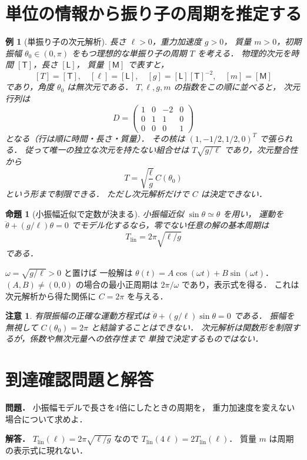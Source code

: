 \documentclass[a5paper,10pt,onecolumn]{jsarticle}
\makeatletter
\theoremstyle{mathnotetheorem}
\newtheorem{proposition}[theorem]{命題}
\newtheorem{example}[theorem]{例}
\newtheorem{remark}[theorem]{注意}
\renewcommand{\proofname}{証明}
\renewenvironment{proof}[1][\proofname]{%
  \par\pushQED{\qed}\normalfont\topsep4\p@\@plus2\p@\relax
  \trivlist\item[\hskip\labelsep\bfseries #1]\ignorespaces
}{\popQED\endtrivlist\@endpefalse}
\makeatother
\begin{document}
\section{単位の情報から振り子の周期を推定する}
\begin{example}[単振り子の次元解析]
長さ $\ell>0$，重力加速度 $g>0$，
質量 $m>0$，初期振幅 $\theta_0\in(0,\pi)$
をもつ理想的な単振り子の周期 $T$ を考える．
物理的次元を時間 $[\mathsf T]$，長さ $[\mathsf L]$，
質量 $[\mathsf M]$ で表すと，
\[
 [T]=[\mathsf T],\quad [\ell]=[\mathsf L],
 \quad [g]=[\mathsf L][\mathsf T]^{-2},
 \quad[m]=[\mathsf M]
\]
であり，角度 $\theta_0$ は無次元である．
$T,\ell,g,m$ の指数をこの順に並べると，
次元行列は
\[
 D=\begin{pmatrix}
 1&0&-2&0\\0&1&1&0\\0&0&0&1
 \end{pmatrix}
\]
となる（行は順に時間・長さ・質量）．
その核は $(1,-1/2,1/2,0)^T$ で張られる．
従って唯一の独立な次元を持たない組合せは
$T\sqrt{g/\ell}$ であり，次元整合性から
\[
 T=\sqrt{\frac\ell g}\,C(\theta_0)
\]
という形まで制限できる．
ただし次元解析だけで $C$ は決定できない．
\end{example}
\begin{proposition}[小振幅近似で定数が決まる]
小振幅近似 $\sin\theta\simeq\theta$ を用い，
運動を
$\ddot\theta+(g/\ell)\theta=0$
でモデル化するなら，零でない任意の解の基本周期は
\[
 T_{\mathrm{lin}}=2\pi\sqrt{\ell/g}
\]
である．
\end{proposition}
\begin{proof}
$\omega=\sqrt{g/\ell}>0$ と置けば
一般解は
$\theta(t)=A\cos(\omega t)+B\sin(\omega t)$．
$(A,B)\ne(0,0)$ の場合の最小正周期は
$2\pi/\omega$ であり，表示式を得る．
これは次元解析から得た関係に
$C=2\pi$ を与える．
\end{proof}
\begin{remark}
有限振幅の正確な運動方程式は
$\ddot\theta+(g/\ell)\sin\theta=0$ である．
振幅を無視して $C(\theta_0)=2\pi$ と結論することはできない．
次元解析は関数形を制限するが，係数や無次元量への依存性まで
単独で決定するものではない．
\end{remark}
\section*{到達確認問題と解答}
\noindent\textbf{問題．}
小振幅モデルで長さを4倍にしたときの周期を，
重力加速度を変えない場合について求めよ．

\medskip\noindent\textbf{解答．}
$T_{\mathrm{lin}}(\ell)=2\pi\sqrt{\ell/g}$
なので
$T_{\mathrm{lin}}(4\ell)=2T_{\mathrm{lin}}(\ell)$．
質量 $m$ は周期の表示式に現れない．
\end{document}

